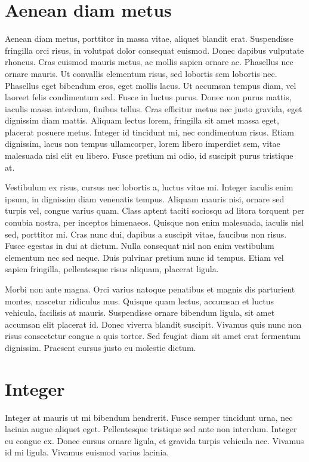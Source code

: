 \documentclass[11pt]{article}
\begin{document}
\section{Aenean diam metus}
Aenean diam metus, porttitor in massa vitae, aliquet blandit erat. Suspendisse fringilla orci risus, in volutpat dolor consequat euismod. Donec dapibus vulputate rhoncus. Cras euismod mauris metus, ac mollis sapien ornare ac. Phasellus nec ornare mauris. Ut convallis elementum risus, sed lobortis sem lobortis nec. Phasellus eget bibendum eros, eget mollis lacus. Ut accumsan tempus diam, vel laoreet felis condimentum sed. Fusce in luctus purus. Donec non purus mattis, iaculis massa interdum, finibus tellus. Cras efficitur metus nec justo gravida, eget dignissim diam mattis. Aliquam lectus lorem, fringilla sit amet massa eget, placerat posuere metus. Integer id tincidunt mi, nec condimentum risus. Etiam dignissim, lacus non tempus ullamcorper, lorem libero imperdiet sem, vitae malesuada nisl elit eu libero. Fusce pretium mi odio, id suscipit purus tristique at.

Vestibulum ex risus, cursus nec lobortis a, luctus vitae mi. Integer iaculis enim ipsum, in dignissim diam venenatis tempus. Aliquam mauris nisi, ornare sed turpis vel, congue varius quam. Class aptent taciti sociosqu ad litora torquent per conubia nostra, per inceptos himenaeos. Quisque non enim malesuada, iaculis nisl sed, porttitor mi. Cras nunc dui, dapibus a suscipit vitae, faucibus non risus. Fusce egestas in dui at dictum. Nulla consequat nisl non enim vestibulum elementum nec sed neque. Duis pulvinar pretium nunc id tempus. Etiam vel sapien fringilla, pellentesque risus aliquam, placerat ligula.

Morbi non ante magna. Orci varius natoque penatibus et magnis dis parturient montes, nascetur ridiculus mus. Quisque quam lectus, accumsan et luctus vehicula, facilisis at mauris. Suspendisse ornare bibendum ligula, sit amet accumsan elit placerat id. Donec viverra blandit suscipit. Vivamus quis nunc non risus consectetur congue a quis tortor. Sed feugiat diam sit amet erat fermentum dignissim. Praesent cursus justo eu molestie dictum.

\section{Integer}
Integer at mauris ut mi bibendum hendrerit. Fusce semper tincidunt urna, nec lacinia augue aliquet eget. Pellentesque tristique sed ante non interdum. Integer eu congue ex. Donec cursus ornare ligula, et gravida turpis vehicula nec. Vivamus id mi ligula. Vivamus euismod varius lacinia.
\end{document}
